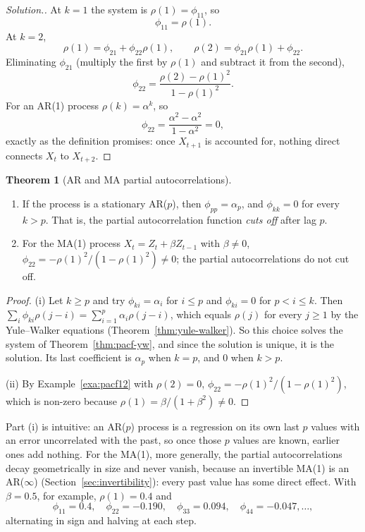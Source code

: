 \documentclass[11pt,a4paper]{article}
\theoremstyle{definition}
\newtheorem{thm}{Theorem}[subsection]
\newenvironment{solution}
  {\renewcommand{\qedsymbol}{}\begin{proof}[\textit{Solution}.]}
  {\end{proof}}
\begin{document}
\begin{solution}
At $k = 1$ the system is $\rho(1) = \phi_{11}$, so
\[
\phi_{11} = \rho(1) .
\]
At $k = 2$,
\[
\rho(1) = \phi_{21} + \phi_{22}\rho(1) , \qquad \rho(2) = \phi_{21}\rho(1) + \phi_{22} .
\]
Eliminating $\phi_{21}$ (multiply the first by $\rho(1)$ and subtract it from the second),
\[
\phi_{22} = \frac{\rho(2) - \rho(1)^2}{1 - \rho(1)^2} .
\]
For an AR(1) process $\rho(k) = \alpha^k$, so
\[
\phi_{22} = \frac{\alpha^2 - \alpha^2}{1 - \alpha^2} = 0 ,
\]
exactly as the definition promises: once $X_{t+1}$ is accounted for, nothing direct connects $X_t$ to $X_{t+2}$.
\end{solution}

\begin{thm}[AR and MA partial autocorrelations]\label{thm:pacf-ar}
\begin{enumerate}[label=(\roman*)]
\item If the process is a stationary AR($p$), then $\phi_{pp} = \alpha_p$, and $\phi_{kk} = 0$ for every $k > p$. That is, the partial
autocorrelation function \emph{cuts off} after lag $p$.
\item For the MA(1) process $X_t = Z_t + \beta Z_{t-1}$ with $\beta \ne 0$, $\phi_{22} = -\rho(1)^2/(1 - \rho(1)^2) \ne 0$; the partial autocorrelations do not cut off.
\end{enumerate}
\end{thm}

\begin{proof}
(i) Let $k \ge p$ and try $\phi_{ki} = \alpha_i$ for $i \le p$ and $\phi_{ki} = 0$ for $p < i \le k$. Then $\sum_i\phi_{ki}\rho(j - i) = \sum_{i=1}^p\alpha_i\rho(j - i)$, which equals $\rho(j)$ for
every $j \ge 1$ by the Yule--Walker equations (Theorem~\ref{thm:yule-walker}). So this choice solves the system of Theorem~\ref{thm:pacf-yw},
and since the solution is unique, it is the solution. Its last coefficient is $\alpha_p$ when $k = p$, and $0$ when $k > p$.

(ii) By Example~\ref{exa:pacf12} with $\rho(2) = 0$, $\phi_{22} = -\rho(1)^2/(1 - \rho(1)^2)$, which is non-zero because $\rho(1) = \beta/(1 + \beta^2) \ne 0$.
\end{proof}

Part (i) is intuitive: an AR($p$) process is a regression on its own last $p$ values with an error uncorrelated with
the past, so once those $p$ values are known, earlier ones add nothing. For the MA(1), more generally, the partial
autocorrelations decay geometrically in size and never vanish, because an invertible MA(1) is an AR($\infty$)
(Section~\ref{sec:invertibility}): every past value has some direct effect. With $\beta = 0.5$, for example, $\rho(1) = 0.4$ and
\[
\phi_{11} = 0.4 , \quad \phi_{22} = -0.190 , \quad \phi_{33} = 0.094 , \quad \phi_{44} = -0.047 , \dots ,
\]
alternating in sign and halving at each step.
\end{document}
